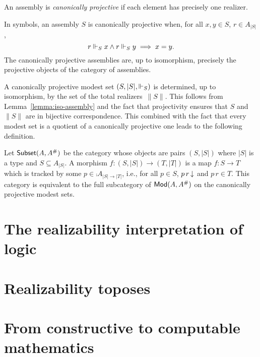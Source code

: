 
\begin{definition}
  An assembly is \emph{canonically projective} if each element has
  precisely one realizer.
\end{definition}

\noindent
In symbols, an assembly $S$ is canonically projective when, for all
$x, y \in S$, $r \in A_{|S|}$,
%
\begin{equation*}
  r \Vdash_S x \land r \Vdash_S y \implies x = y.
\end{equation*}
%
The canonically projective assemblies are, up to isomorphism,
precisely the projective objects of the category of assemblies.

A canonically projective modest set $(S, |S|, {\Vdash_S})$ is determined,
up to isomorphism, by the set of the total realizers~$\|S\|$. This
follows from Lemma~\ref{lemma:iso-assembly} and the fact that
projectivity ensures that $S$ and $\|S\|$ are in bijective
correspondence. This combined with the fact that every modest set is a
quotient of a canonically projective one leads to the following
definition.

Let $\mathsf{Subset}(A, A^{\#})$ be the category whose objects are pairs
$(S, |S|)$ where $|S|$ is a type and $S \subseteq A_{|S|}$. A morphism
$f : (S, |S|) \to (T, |T|)$ is a map $f : S \to T$ which is tracked by
some $p \in \comp{A}_{|S| \to |T|}$, i.e., for all $p \in S$,
$p\,r\,{\downarrow}$ and $p\,r \in T$. This category is equivalent to the
full subcategory of $\mathsf{Mod}(A, A^{\#})$ on the canonically projective
modest sets.


\section{The realizability interpretation of logic}
\label{sec:realizability-interpretation}

\section{Realizability toposes}
\label{sec:realizability-toposes}

\section{From constructive to computable mathematics}
\label{sec:constructive-math}



